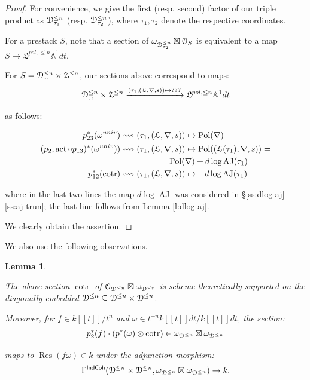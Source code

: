 \documentclass[reqno,11pt]{amsart}
\numberwithin{equation}{subsection}
\newtheorem{lem}[thm]{Lemma}
\theoremstyle{remark}
\newcommand{\xar}[1]{\xrightarrow{#1}}
\newcommand{\bA}{{\mathbb A}}
\newcommand{\sD}{{\EuScript D}}
\newcommand{\sL}{{\EuScript L}}
\newcommand{\sO}{{\EuScript O}}
\newcommand{\sZ}{{\EuScript Z}}
\newcommand{\fL}{{\mathfrak L}}
\newcommand{\on}{\operatorname}
\newcommand{\cotr}{\on{cotr}}
\newcommand{\act}{\on{act}}
\newcommand{\Res}{\on{Res}}
\newcommand{\IndCoh}{\mathsf{IndCoh}}
\newcommand{\AJ}{\on{AJ}}
\newcommand{\Pol}{\on{Pol}}
\renewcommand{\subset}{\subseteq}
\begin{document}
\begin{proof}

For convenience, we give the first (resp. second) factor
of our triple product as 
$\sD_{\tau_1}^{\leq n}$ (resp. $\sD_{\tau_2}^{\leq n}$), 
where $\tau_1,\tau_2$ denote the respective coordinates. 

For a prestack $S$, note that a section of 
$\omega_{\sD_{\tau_2}^{\leq n}} \boxtimes \sO_S$ is equivalent to
a map $S \to \fL^{pol,\leq n} \bA^1 dt$.

For $S = \sD_{\tau_1}^{\leq n} \times \sZ^{\leq n}$,
our sections above correspond to maps:
%
\[
\sD_{\tau_1}^{\leq n} \times \sZ^{\leq n} 
\xar{(\tau_1,(\sL,\nabla,s)) \mapsto ???}
\fL^{pol,\leq n} \bA^1 dt
\]

\noindent as follows:

\begin{align*}
p_{23}^*(\omega^{univ}) & \leftrightsquigarrow 
(\tau_1,(\sL,\nabla,s)) \mapsto 
\Pol(\nabla) \\
(p_2,\act \circ p_{13})^*(\omega^{univ})) 
& \leftrightsquigarrow 
(\tau_1,(\sL,\nabla,s)) \mapsto 
\Pol((\sL(\tau_1),\nabla,s)) = \\ 
& \hspace{2cm} \Pol(\nabla)+d\log\AJ(\tau_1) \\
p_{12}^*(\cotr) & \leftrightsquigarrow 
(\tau_1,(\sL,\nabla,s)) \mapsto 
-d\log\AJ(\tau_1)
\end{align*}

\noindent where in the last two lines the map
$d\log\AJ$ was considered in
\S \ref{ss:dlog-aj}-\ref{ss:aj-trun}; the last line
follows from Lemma \ref{l:dlog-aj}.

We clearly obtain the assertion.

\end{proof}

We also use the following observations.

\begin{lem}\label{l:cotr-2}

The above section $\cotr$ of 
$\sO_{\sD^{\leq n}} \boxtimes \omega_{\sD^{\leq n}}$
is scheme-theoretically supported on the diagonally embedded
$\sD^{\leq n} \subset \sD^{\leq n} \times \sD^{\leq n}$.

Moreover, for $f \in k[[t]]/t^n$ and 
$\omega \in t^{-n}k[[t]]dt/k[[t]]dt$, the section:
%
\[
p_2^*(f) \cdot (p_1^*(\omega) \otimes \cotr) \in 
\omega_{\sD^{\leq n}} \boxtimes \omega_{\sD^{\leq n}} 
\]

\noindent maps to $\Res(f\omega) \in k$ under the
adjunction morphism:
%
\[
\Gamma^{\IndCoh}(\sD^{\leq n} \times \sD^{\leq n},
\omega_{\sD^{\leq n}} \boxtimes \omega_{\sD^{\leq n}} ) \to k.
\]

\end{lem}
\end{document}
